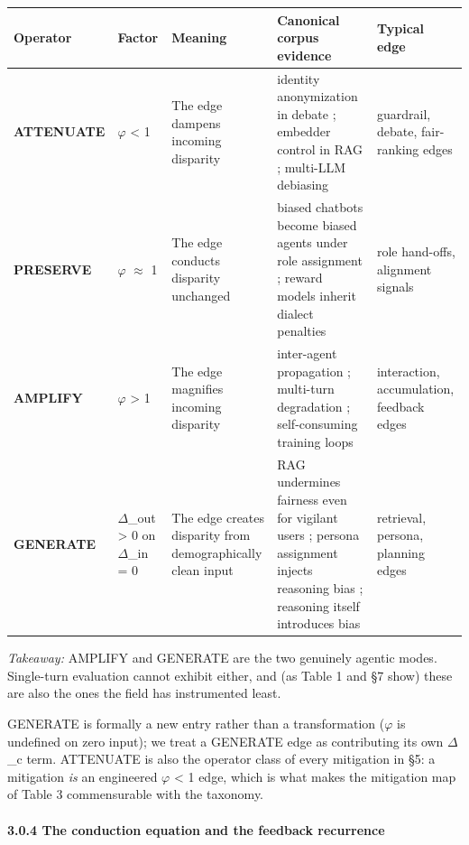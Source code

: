 \documentclass[10pt]{article}
\begin{document}
\begin{center}\footnotesize
\begin{longtable}{|p{}|p{}|p{}|p{}|p{}|}
\hline \textbf{Operator} & \textbf{Factor} & \textbf{Meaning} & \textbf{Canonical corpus evidence} & \textbf{Typical edge} \\ \hline\endhead
\textbf{ATTENUATE} & $\varphi$ < 1 & The edge dampens incoming disparity & identity anonymization in debate \cite{choi2025identity}; embedder control in RAG \cite{kim2025mitigating}; multi-LLM debiasing \cite{owens2024multi} & guardrail, debate, fair-ranking edges \\ \hline
\textbf{PRESERVE} & $\varphi$ $\approx$ 1 & The edge conducts disparity unchanged & biased chatbots become biased agents under role assignment \cite{cao2026from}; reward models inherit dialect penalties \cite{mire2025rejected} & role hand-offs, alignment signals \\ \hline
\textbf{AMPLIFY} & $\varphi$ > 1 & The edge magnifies incoming disparity & inter-agent propagation \cite{nguyen2025social}; multi-turn degradation \cite{fan2024fairmt}; self-consuming training loops \cite{wyllie2024fairness} & interaction, accumulation, feedback edges \\ \hline
\textbf{GENERATE} & $\Delta$\_out > 0 on $\Delta$\_in = 0 & The edge creates disparity from demographically clean input & RAG undermines fairness even for vigilant users \cite{hu2024free}; persona assignment injects reasoning bias \cite{gupta2023bias}; reasoning itself introduces bias \cite{wu2025reasoning} & retrieval, persona, planning edges \\ \hline
\end{longtable}\end{center}

\emph{Takeaway:} AMPLIFY and GENERATE are the two genuinely agentic modes. Single-turn evaluation cannot exhibit either, and (as Table 1 and \S{}7 show) these are also the ones the field has instrumented least.

GENERATE is formally a new entry rather than a transformation ($\varphi$ is undefined on zero input); we treat a GENERATE edge as contributing its own $\Delta$\_c term. ATTENUATE is also the operator class of every mitigation in \S{}5: a mitigation \emph{is} an engineered $\varphi$ < 1 edge, which is what makes the mitigation map of Table 3 commensurable with the taxonomy.

\paragraph*{3.0.4 The conduction equation and the feedback recurrence}
\end{document}
